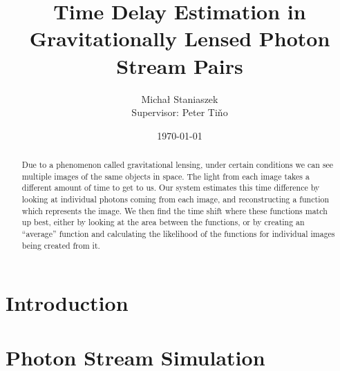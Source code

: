 \documentclass[11pt]{article}
\title{Time Delay Estimation in Gravitationally Lensed Photon Stream Pairs}
\author{\Large{Micha{\l} Staniaszek} \\\small{Supervisor: Peter Ti{\v{n}}o}}
\date{\today}
\begin{document}
\maketitle



\begin{abstract}
  Due to a phenomenon called gravitational lensing, under certain conditions we
  can see multiple images of the same objects in space. The light from each
  image takes a different amount of time to get to us. Our system estimates this
  time difference by looking at individual photons coming from each image, and
  reconstructing a function which represents the image. We then find the time
  shift where these functions match up best, either by looking at the area
  between the functions, or by creating an ``average'' function and calculating
  the likelihood of the functions for individual images being created from it.
\end{abstract}

\section{Introduction}
\label{sec-1}


\section{Photon Stream Simulation}
\label{sec-2}
\end{document}
